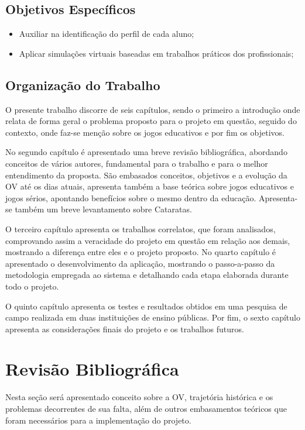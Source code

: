 \documentclass[
	12pt,				%
    oneside,			%
	a4paper,			%
	english,			%
	french,				%
	spanish,			%
	brazil,				%
	]{abntex2}
\begin{document}
\section{Objetivos Específicos}

\begin{itemize}
    \item Auxiliar na identificação do perfil de cada aluno;

    \item Aplicar simulações virtuais baseadas em trabalhos práticos dos profissionais;
\end{itemize}

\section{Organização do Trabalho}

O presente trabalho discorre de seis capítulos, sendo o primeiro a introdução onde relata de forma geral o problema proposto para o projeto em questão, seguido do contexto, onde faz-se menção sobre os jogos educativos e por fim os objetivos. 

No segundo capítulo é apresentado uma breve revisão bibliográfica, abordando conceitos de vários autores, fundamental para o trabalho e para o melhor entendimento da proposta. São embasados conceitos, objetivos e a evolução da OV até os dias atuais, apresenta também a base teórica sobre jogos educativos e jogos sérios, apontando benefícios sobre o mesmo  dentro da educação. Apresenta-se também um breve levantamento sobre Cataratas. 

O terceiro capítulo apresenta os trabalhos correlatos, que foram analisados, comprovando assim a veracidade do projeto em questão em relação aos demais, mostrando a diferença entre eles e o projeto proposto. 
No quarto capítulo é apresentado o desenvolvimento da aplicação, mostrando o passo-a-passo da metodologia empregada ao sistema e detalhando cada etapa elaborada durante todo o projeto.

O quinto capítulo apresenta os testes e resultados obtidos em uma pesquisa de campo realizada em duas instituições de ensino públicas. Por fim, o sexto capítulo apresenta as considerações finais do projeto e os trabalhos futuros.
\chapter{Revisão Bibliográfica}

Nesta seção será apresentado conceito sobre a OV, trajetória histórica e os problemas decorrentes de sua falta, além de outros embasamentos teóricos que foram necessários para a implementação do projeto. 
\end{document}

